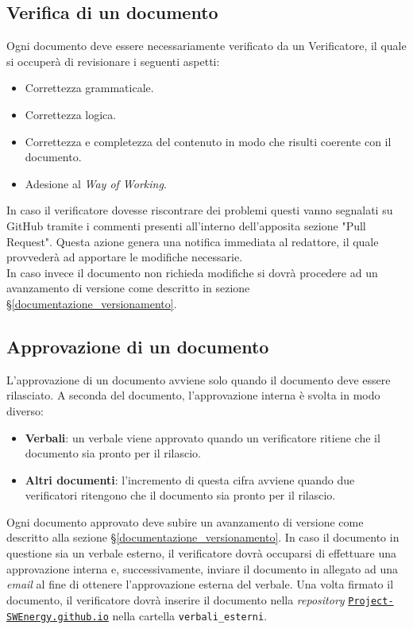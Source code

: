 \subsection{Verifica di un documento}
Ogni documento deve essere necessariamente verificato da un Verificatore, il
quale si occuperà di revisionare i seguenti aspetti:
\begin{itemize}
	\item Correttezza grammaticale.
	\item Correttezza logica.
	\item Correttezza e completezza del contenuto in modo che risulti coerente
	      con il documento.
	\item Adesione al \textit{Way of Working}.
\end{itemize}
\noindent
In caso il verificatore dovesse riscontrare dei problemi questi vanno segnalati
su GitHub tramite i commenti presenti all'interno dell'apposita sezione
"Pull Request".
Questa azione genera una notifica immediata al redattore, il quale provvederà
ad apportare le modifiche necessarie. \\
In caso invece il documento non richieda modifiche si dovrà procedere ad un
avanzamento di versione come descritto in sezione
\S\ref{documentazione_versionamento}.


\subsection{Approvazione di un documento}
L'approvazione di un documento avviene solo quando il documento deve essere
rilasciato. A seconda del documento, l'approvazione interna è svolta in modo
diverso:
\begin{itemize}
	\item \textbf{Verbali}: un verbale viene approvato quando un verificatore
	      ritiene che il documento sia pronto per il rilascio.

	\item \textbf{Altri documenti}: l'incremento di questa cifra avviene
	      quando due verificatori ritengono che il documento sia pronto per il
	      rilascio.
\end{itemize}

Ogni documento approvato deve subire un avanzamento di versione come descritto
alla sezione \S\ref{documentazione_versionamento}.
\noindent
In caso il documento in questione sia un verbale esterno, il verificatore dovrà
occuparsi di effettuare una approvazione interna e, successivamente, inviare il
documento in allegato ad una \textit{email} al fine di ottenere l'approvazione
esterna del verbale. Una volta firmato il documento, il verificatore dovrà
inserire il documento nella \textit{repository}
\href{https://github.com/Project-SWEnergy/Project-SWEnergy.github.io}{\texttt{Project-SWEnergy.github.io}}
nella cartella \texttt{verbali\_esterni}.


